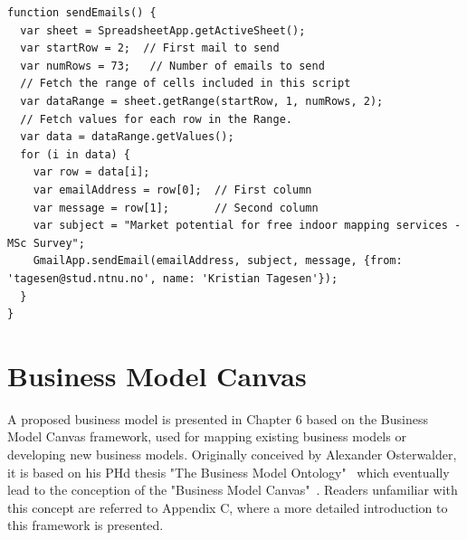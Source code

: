 
\lstset{
   language=JavaScript,
   extendedchars=true,
   basicstyle=\footnotesize\ttfamily,
   showstringspaces=false,
   showspaces=false,
   numbers=left,
   numberstyle=\footnotesize,
   numbersep=9pt,
   tabsize=2,
   breaklines=true,
   showtabs=false,
   captionpos=b
}

\medskip
\begin{lstlisting}[caption=Email Sendout Script written in Google Scripts,label={lst:email}]
function sendEmails() {
  var sheet = SpreadsheetApp.getActiveSheet();
  var startRow = 2;  // First mail to send
  var numRows = 73;   // Number of emails to send
  // Fetch the range of cells included in this script
  var dataRange = sheet.getRange(startRow, 1, numRows, 2);
  // Fetch values for each row in the Range.
  var data = dataRange.getValues();
  for (i in data) {
    var row = data[i];
    var emailAddress = row[0];  // First column
    var message = row[1];       // Second column
    var subject = "Market potential for free indoor mapping services - MSc Survey";
    GmailApp.sendEmail(emailAddress, subject, message, {from: 'tagesen@stud.ntnu.no', name: 'Kristian Tagesen'});
  }
}
\end{lstlisting}

\section{Business Model Canvas}
A proposed business model is presented in Chapter 6 based on the Business Model Canvas framework, used for mapping existing business models or developing new business models. Originally conceived by Alexander Osterwalder, it is based on his PHd thesis "The Business Model Ontology"~\cite{alexanderosterwalder2004} which eventually lead to the conception of the "Business Model Canvas"~\cite{billmartin2008}. Readers unfamiliar with this concept are referred to Appendix C, where a more detailed introduction to this framework is presented. 